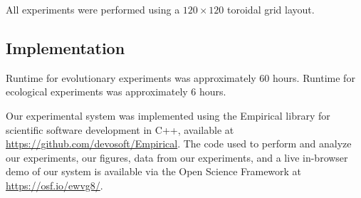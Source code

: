 All experiments were performed using a  $120 \times 120$ toroidal grid layout.

\subsection{Implementation}

Runtime for evolutionary experiments was approximately 60 hours.
Runtime for ecological experiments was approximately 6 hours.

Our experimental system was implemented using the Empirical library for scientific software development in C++, available at \url{https://github.com/devosoft/Empirical}.
The code used to perform and analyze our experiments, our figures, data from our experiments, and a live in-browser demo of our system is available via the Open Science Framework at \url{https://osf.io/ewvg8/}.

